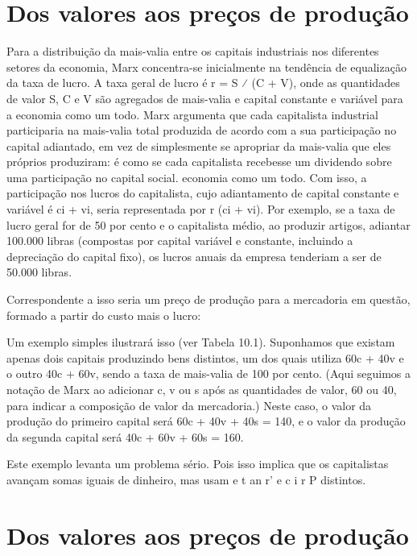 \section{Dos valores aos preços de produção}
 \par 
Para a distribuição da mais-valia entre os capitais industriais nos diferentes setores da economia, Marx concentra-se inicialmente na tendência de equalização da taxa de lucro. A taxa geral de lucro é r = S ⁄ (C + V), onde as quantidades de valor S, C e V são agregados de mais-valia e capital constante e variável para a economia como um todo. Marx argumenta que cada capitalista industrial participaria na mais-valia total produzida de acordo com a sua participação no capital adiantado, em vez de simplesmente se apropriar da mais-valia que eles próprios produziram: é como se cada capitalista recebesse um dividendo sobre uma participação no capital social. economia como um todo. Com isso, a participação nos lucros do capitalista, cujo adiantamento de capital constante e variável é ci + vi, seria representada por r (ci + vi). Por exemplo, se a taxa de lucro geral for de {\color{blue}50} por cento e o capitalista médio, ao produzir artigos, adiantar {\color{blue}100}.000 libras (compostas por capital variável e constante, incluindo a depreciação do capital fixo), os lucros anuais da empresa tenderiam a ser de {\color{blue}50}.{\color{blue}000} libras.
 \par 
Correspondente a isso seria um preço de produção para a mercadoria em questão, formado a partir do custo mais o lucro:
 \par 
Um exemplo simples ilustrará isso (ver Tabela {\color{blue}10}.{\color{blue}1}). Suponhamos que existam apenas dois capitais produzindo bens distintos, um dos quais utiliza 60c + 40v e o outro 40c + 60v, sendo a taxa de mais-valia de {\color{blue}100} por cento. (Aqui seguimos a notação de Marx ao adicionar c, v ou s após as quantidades de valor, {\color{blue}60} ou 40, para indicar a composição de valor da mercadoria.) Neste caso, o valor da produção do primeiro capital será 60c + 40v + 40s = 140, e o valor da produção da segunda capital será 40c + 60v + 60s = {\color{blue}160}.
 \par 
Este exemplo levanta um problema sério. Pois isso implica que os capitalistas avançam somas iguais de dinheiro, mas usam e t an r’ e c i r P distintos.
 \par 
\section{Dos valores aos preços de produção}
 \par 
